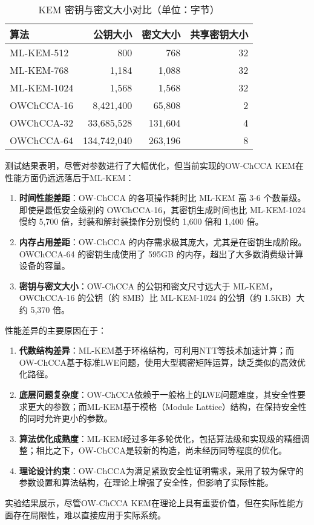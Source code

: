 \begin{table}[ht]
\centering
\caption{KEM 密钥与密文大小对比（单位：字节）}
\begin{tabular}{|l|r|r|r|}
\hline
\textbf{算法} & \textbf{公钥大小} & \textbf{密文大小} & \textbf{共享密钥大小} \\
\hline
ML-KEM-512    & 800               & 768              & 32                   \\
ML-KEM-768    & 1,184             & 1,088            & 32                   \\
ML-KEM-1024   & 1,568             & 1,568            & 32                   \\
\hline
OWChCCA-16    & 8,421,400         & 65,808           & 2                    \\
OWChCCA-32    & 33,685,528        & 131,604          & 4                    \\
OWChCCA-64    & 134,742,040       & 263,196          & 8                    \\
\hline
\end{tabular}
\label{tab:kem-sizes}
\end{table}

测试结果表明，尽管对参数进行了大幅优化，但当前实现的OW-ChCCA KEM在性能方面仍远远落后于ML-KEM：

\begin{enumerate}
    \item \textbf{时间性能差距}：OW-ChCCA 的各项操作耗时比 ML-KEM 高 3-6 个数量级。即使是最低安全级别的 OWChCCA-16，其密钥生成时间也比 ML-KEM-1024 慢约 5,700 倍，封装和解封装操作分别慢约 1,600 倍和 1,400 倍。
    
    \item \textbf{内存占用差距}：OW-ChCCA 的内存需求极其庞大，尤其是在密钥生成阶段。OWChCCA-64 的密钥生成使用了 595GB 的内存，超出了大多数消费级计算设备的容量。
    
    \item \textbf{密钥与密文大小}：OW-ChCCA 的公钥和密文尺寸远大于 ML-KEM，OWChCCA-16 的公钥（约 8MB）比 ML-KEM-1024 的公钥（约 1.5KB）大约 5,370 倍。
\end{enumerate}

性能差异的主要原因在于：

\begin{enumerate}
    \item \textbf{代数结构差异}：ML-KEM基于环格结构，可利用NTT等技术加速计算；而OW-ChCCA基于标准LWE问题，使用大型稠密矩阵运算，缺乏类似的高效优化路径。
    
    \item \textbf{底层问题复杂度}：OW-ChCCA依赖于一般格上的LWE问题难度，其安全性要求更大的参数；而ML-KEM基于模格（Module Lattice）结构，在保持安全性的同时允许更小的参数。
    
    \item \textbf{算法优化成熟度}：ML-KEM经过多年多轮优化，包括算法级和实现级的精细调整；相比之下，OW-ChCCA是较新的构造，尚未经历同等程度的优化。
    
    \item \textbf{理论设计约束}：OW-ChCCA为满足紧致安全性证明需求，采用了较为保守的参数设置和算法结构，在理论上增强了安全性，但影响了实际性能。
\end{enumerate}

实验结果展示，尽管OW-ChCCA KEM在理论上具有重要价值，但在实际性能方面存在局限性，难以直接应用于实际系统。